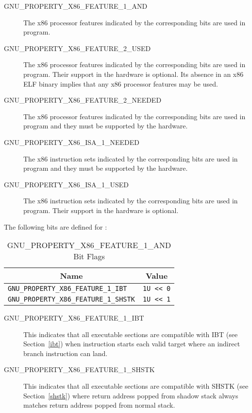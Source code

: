 \begin{description}
 \item[GNU_PROPERTY_X86_FEATURE_1_AND] The x86 processor features
   indicated by the corresponding bits are used in program.
 \item[GNU_PROPERTY_X86_FEATURE_2_USED] The x86 processor features
   indicated by the corresponding bits are used in program.  Their
   support in the hardware is optional.  Its absence in an x86 ELF
   binary implies that any x86 processor features may be used.
 \item[GNU_PROPERTY_X86_FEATURE_2_NEEDED] The x86 processor features
   indicated by the corresponding bits are used in program and they
   must be supported by the hardware.
 \item[GNU_PROPERTY_X86_ISA_1_NEEDED] The x86 instruction sets indicated
   by the corresponding bits are used in program and they must be
   supported by the hardware.
 \item[GNU_PROPERTY_X86_ISA_1_USED] The x86 instruction sets indicated
   by the corresponding bits are used in program.  Their support in the
   hardware is optional.
\end{description}

The following bits are defined for :

\begin{table}[H]
\Hrule
  \caption{GNU_PROPERTY_X86_FEATURE_1_AND Bit Flags}
  \begin{center}
    \begin{tabular}[t]{l|l}
      \multicolumn{1}{c}{Name} & \multicolumn{1}{c}{Value} \\
      \hline
     \texttt{GNU_PROPERTY_X86_FEATURE_1_IBT} & \texttt{1U << 0} \\
     \texttt{GNU_PROPERTY_X86_FEATURE_1_SHSTK} & \texttt{1U << 1} \\
    \end{tabular}
  \end{center}
\Hrule
\end{table}

\begin{description}
 \item[GNU_PROPERTY_X86_FEATURE_1_IBT] This indicates that all executable
   sections are compatible with IBT (see Section~\ref{ibt}) when
    instruction starts each valid target where an indirect
   branch instruction can land.
 \item[GNU_PROPERTY_X86_FEATURE_1_SHSTK] This indicates that all
   executable sections are compatible with SHSTK (see Section~\ref{shstk})
   where return address popped from shadow stack always matches return
   address popped from normal stack.
\end{description}

